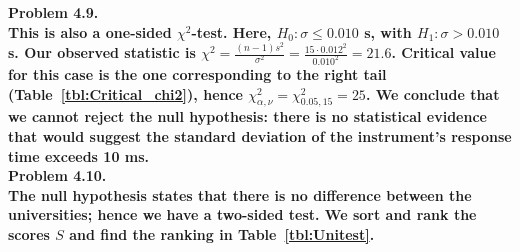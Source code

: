 \noindent
\bf{Problem 4.9.} \\

This is also a one-sided $\chi^2$-test.  Here, $H_0: \sigma \leq 0.010$ s, with $H_1: \sigma > 0.010$ s.
Our observed statistic is $\chi^2 = \frac{(n - 1)s^2}{\sigma^2} = \frac{15\cdot0.012^2}{0.010^2} = 21.6$.
Critical value for this case is the one corresponding to the right tail (Table~\ref{tbl:Critical_chi2}), hence
$\chi^2_{\alpha,\nu} = \chi^2_{0.05,15} = 25$.
We conclude that we cannot reject the null hypothesis: there is no statistical evidence that would suggest the
standard deviation of the instrument's response time exceeds 10 ms.
\\

\noindent
\bf{Problem 4.10.} \\

The null hypothesis states that there is no difference between the universities; hence we have a two-sided test.
We sort and rank the scores $S$ and find the ranking in Table~\ref{tbl:Unitest}.


